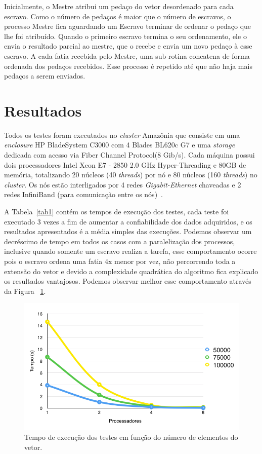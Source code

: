 \documentclass[portuguese, conference]{IEEEtran}
\begin{document}
Inicialmente, o Mestre atribui um pedaço do vetor desordenado para cada escravo. Como o número de pedaços é maior que o número de escravos, o processo Mestre fica aguardando um Escravo terminar de ordenar o pedaço que lhe foi atribuído. Quando o primeiro escravo termina o seu ordenamento, ele o envia o resultado parcial ao mestre, que o recebe e envia um novo pedaço à esse escravo. A cada fatia recebida pelo Mestre, uma sub-rotina concatena de forma ordenada dos pedaços recebidos. Esse processo é repetido até que não haja mais pedaços a serem enviados. 

\section{Resultados}

Todos os testes foram executados no {\it cluster} Amazônia que consiste em uma  {\it enclosure} HP BladeSystem C3000 com 4 Blades BL620c G7 e uma {\it storage} dedicada com acesso via Fiber Channel Protocol(8 Gib/s). Cada máquina possui dois processadores Intel Xeon E7 - 2850 2.0 GHz Hyper-Threading e 80GB de memória, totalizando 20 núcleos (40 {\it threads}) por nó e 80 núcleos (160 {\it threads}) no {\it cluster}. Os nós estão interligados por 4 redes {\it Gigabit-Ethernet} chaveadas e 2 redes InfiniBand (para comunicação entre os nós)~\cite{IDE15}. 

A Tabela~\ref{tab1} contém os tempos de execução dos testes, cada teste foi executado 3 vezes a fim de aumentar a confiabilidade dos dados adquiridos, e os resultados apresentados é a média simples das execuções. Podemos observar um decréscimo de tempo em todos os casos com a paralelização dos processos, inclusive quando somente um escravo realiza a tarefa, esse comportamento ocorre pois o escravo ordena uma fatia 4x menor por vez, não percorrendo toda a extensão do vetor e devido a complexidade quadrática do algoritmo fica explicado os resultados vantajosos. Podemos observar melhor esse comportamento através da Figura ~\ref{fig:tempo}.

\begin{figure}[htb]
\raggedright\includegraphics[width=.5\textwidth]{tempo.png}
\caption{\label{fig:tempo} Tempo de execução dos testes em função do número de elementos do vetor.}
\end{figure}
\end{document}
